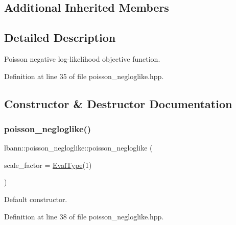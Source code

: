 \subsection*{Additional Inherited Members}


\subsection{Detailed Description}
Poisson negative log-\/likelihood objective function. 

Definition at line 35 of file poisson\+\_\+negloglike.\+hpp.



\subsection{Constructor \& Destructor Documentation}
\mbox{\label{classlbann_1_1poisson__negloglike_af2eabe95046d8995263a2df9e8e34f7d}} 
\subsubsection{\texorpdfstring{poisson\+\_\+negloglike()}{poisson\_negloglike()}\hspace{0.1cm}{\footnotesize\ttfamily [1/2]}}
{\footnotesize\ttfamily lbann\+::poisson\+\_\+negloglike\+::poisson\+\_\+negloglike (\begin{DoxyParamCaption}\item[{\hyperlink{base_8hpp_a3266f5ac18504bbadea983c109566867}{Eval\+Type}}]{scale\+\_\+factor = {\ttfamily \hyperlink{base_8hpp_a3266f5ac18504bbadea983c109566867}{Eval\+Type}(1)} }\end{DoxyParamCaption})\hspace{0.3cm}{\ttfamily [inline]}}

Default constructor. 

Definition at line 38 of file poisson\+\_\+negloglike.\+hpp.


